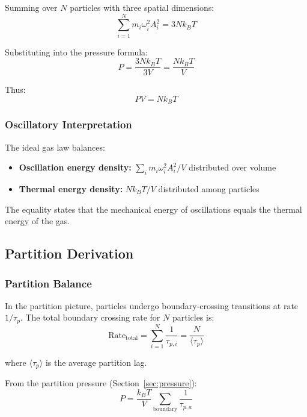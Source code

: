 Summing over $N$ particles with three spatial dimensions:
\begin{equation}
\sum_{i=1}^{N} m_i \omega_i^2 A_i^2 = 3Nk_B T
\end{equation}

Substituting into the pressure formula:
\begin{equation}
P = \frac{3Nk_B T}{3V} = \frac{Nk_B T}{V}
\end{equation}

Thus:
\begin{equation}
PV = Nk_B T
\end{equation}

\subsubsection{Oscillatory Interpretation}

The ideal gas law balances:
\begin{itemize}
\item \textbf{Oscillation energy density:} $\sum_i m_i \omega_i^2 A_i^2 / V$ distributed over volume
\item \textbf{Thermal energy density:} $Nk_B T / V$ distributed among particles
\end{itemize}

The equality states that the mechanical energy of oscillations equals the thermal energy of the gas.

\subsection{Partition Derivation}

\subsubsection{Partition Balance}

In the partition picture, particles undergo boundary-crossing transitions at rate $1/\tau_p$. The total boundary crossing rate for $N$ particles is:
\begin{equation}
\text{Rate}_{\text{total}} = \sum_{i=1}^{N} \frac{1}{\tau_{p,i}} = \frac{N}{\langle\tau_p\rangle}
\end{equation}

where $\langle\tau_p\rangle$ is the average partition lag.

From the partition pressure (Section~\ref{sec:pressure}):
\begin{equation}
P = \frac{k_B T}{V} \sum_{\text{boundary}} \frac{1}{\tau_{p,a}}
\end{equation}

